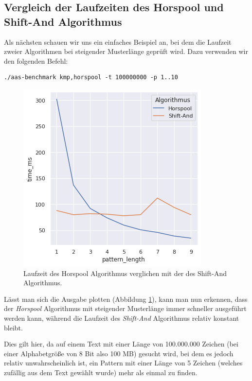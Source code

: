 \documentclass[twocolumn]{article}
\begin{document}
\subsection*{Vergleich der Laufzeiten des Horspool und Shift-And Algorithmus}

Als nächsten schauen wir uns ein einfaches Beispiel an, bei dem die Laufzeit zweier Algorithmen bei steigender Musterlänge geprüft wird. Dazu verwenden wir den folgenden Befehl:

\begin{lstlisting}[breaklines=true,autogobble=true]
    ./aas-benchmark kmp,horspool -t 100000000 -p 1..10
\end{lstlisting}

\begin{figure}
    \centering
    \includegraphics[width=0.85\linewidth]{assets/graph_2.png}
    \caption{Laufzeit des Horspool Algorithmus verglichen mit der des Shift-And Algorithmus.}
    \label{fig:runtime_horspool_shift_and}
\end{figure}

Lässt man sich die Ausgabe plotten (Abbildung \ref{fig:runtime_horspool_shift_and}), kann man nun erkennen, dass der \textit{Horspool} Algorithmus mit steigender Musterlänge immer schneller ausgeführt werden kann, während die Laufzeit des \textit{Shift-And} Algorithmus relativ konstant bleibt.

Dies gilt hier, da auf einem Text mit einer Länge von 100.000.000 Zeichen (bei einer Alphabetgröße von 8 Bit also 100 MB) gesucht wird, bei dem es jedoch relativ unwahrscheinlich ist, ein Pattern mit einer Länge von 5 Zeichen (welches zufällig aus dem Text gewählt wurde) mehr als einmal zu finden.
\end{document}
